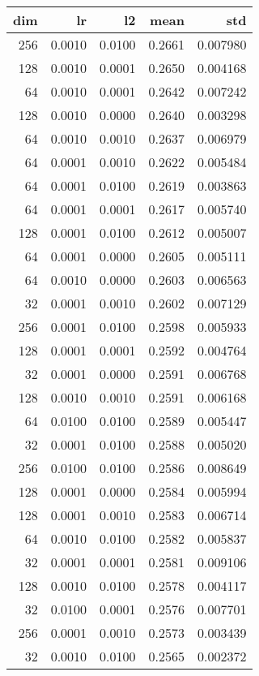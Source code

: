 \begin{tabular}{rrrrr}
\toprule
 dim &      lr &      l2 &    mean &       std \\
\midrule
 256 &  0.0010 &  0.0100 &  0.2661 &  0.007980 \\
 128 &  0.0010 &  0.0001 &  0.2650 &  0.004168 \\
  64 &  0.0010 &  0.0001 &  0.2642 &  0.007242 \\
 128 &  0.0010 &  0.0000 &  0.2640 &  0.003298 \\
  64 &  0.0010 &  0.0010 &  0.2637 &  0.006979 \\
  64 &  0.0001 &  0.0010 &  0.2622 &  0.005484 \\
  64 &  0.0001 &  0.0100 &  0.2619 &  0.003863 \\
  64 &  0.0001 &  0.0001 &  0.2617 &  0.005740 \\
 128 &  0.0001 &  0.0100 &  0.2612 &  0.005007 \\
  64 &  0.0001 &  0.0000 &  0.2605 &  0.005111 \\
  64 &  0.0010 &  0.0000 &  0.2603 &  0.006563 \\
  32 &  0.0001 &  0.0010 &  0.2602 &  0.007129 \\
 256 &  0.0001 &  0.0100 &  0.2598 &  0.005933 \\
 128 &  0.0001 &  0.0001 &  0.2592 &  0.004764 \\
  32 &  0.0001 &  0.0000 &  0.2591 &  0.006768 \\
 128 &  0.0010 &  0.0010 &  0.2591 &  0.006168 \\
  64 &  0.0100 &  0.0100 &  0.2589 &  0.005447 \\
  32 &  0.0001 &  0.0100 &  0.2588 &  0.005020 \\
 256 &  0.0100 &  0.0100 &  0.2586 &  0.008649 \\
 128 &  0.0001 &  0.0000 &  0.2584 &  0.005994 \\
 128 &  0.0001 &  0.0010 &  0.2583 &  0.006714 \\
  64 &  0.0010 &  0.0100 &  0.2582 &  0.005837 \\
  32 &  0.0001 &  0.0001 &  0.2581 &  0.009106 \\
 128 &  0.0010 &  0.0100 &  0.2578 &  0.004117 \\
  32 &  0.0100 &  0.0001 &  0.2576 &  0.007701 \\
 256 &  0.0001 &  0.0010 &  0.2573 &  0.003439 \\
  32 &  0.0010 &  0.0100 &  0.2565 &  0.002372 \\

\end{tabular}
